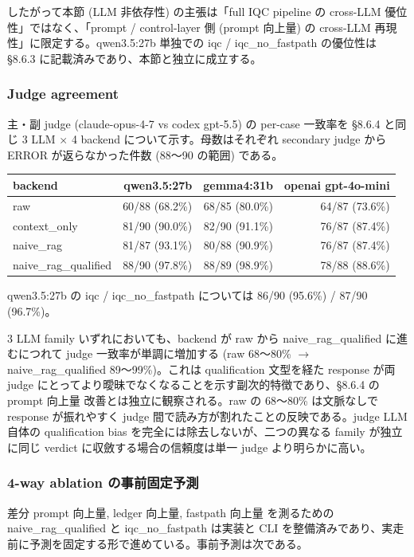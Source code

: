 \documentclass[12pt,a4paper]{article}
\begin{document}
したがって本節 (LLM 非依存性) の主張は「full IQC pipeline の cross-LLM 優位性」ではなく、「prompt / control-layer 側 (prompt 向上量) の cross-LLM 再現性」に限定する。qwen3.5:27b 単独での iqc / iqc\_no\_fastpath の優位性は \S8.6.3 に記載済みであり、本節と独立に成立する。

\subsubsection{Judge agreement}

主・副 judge (claude-opus-4-7 vs codex gpt-5.5) の per-case 一致率を \S8.6.4 と同じ 3 LLM $\times$ 4 backend について示す。母数はそれぞれ secondary judge から ERROR が返らなかった件数 (88〜90 の範囲) である。

{\def\LTcaptype{table}
\begin{longtable}[]{@{}lrrr@{}}
\toprule\noalign{}
backend & qwen3.5:27b & gemma4:31b & openai gpt-4o-mini \\
\midrule\noalign{}
\endhead
\bottomrule\noalign{}
\endlastfoot
raw & 60/88 (68.2\%) & 68/85 (80.0\%) & 64/87 (73.6\%) \\
context\_only & 81/90 (90.0\%) & 82/90 (91.1\%) & 76/87 (87.4\%) \\
naive\_rag & 81/87 (93.1\%) & 80/88 (90.9\%) & 76/87 (87.4\%) \\
naive\_rag\_qualified & 88/90 (97.8\%) & 88/89 (98.9\%) & 78/88 (88.6\%) \\
\end{longtable}
}

qwen3.5:27b の iqc / iqc\_no\_fastpath については 86/90 (95.6\%) / 87/90 (96.7\%)。

3 LLM family いずれにおいても、backend が raw から naive\_rag\_qualified に進むにつれて judge 一致率が単調に増加する (raw 68〜80\% $\to$ naive\_rag\_qualified 89〜99\%)。これは qualification 文型を経た response が両 judge にとってより曖昧でなくなることを示す副次的特徴であり、\S8.6.4 の prompt 向上量 改善とは独立に観察される。raw の 68〜80\% は文脈なしで response が振れやすく judge 間で読み方が割れたことの反映である。judge LLM 自体の qualification bias を完全には除去しないが、二つの異なる family が独立に同じ verdict に収斂する場合の信頼度は単一 judge より明らかに高い。

\subsubsection{4-way ablation の事前固定予測}

差分 prompt 向上量, ledger 向上量, fastpath 向上量 を測るための naive\_rag\_qualified と iqc\_no\_fastpath は実装と CLI を整備済みであり、実走前に予測を固定する形で進めている。事前予測は次である。
\end{document}

